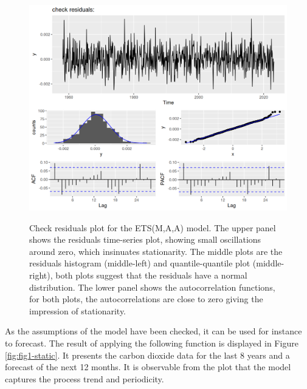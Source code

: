 \begin{figure}

{\centering \includegraphics[width=1\linewidth,alt={Check residuals plot for the ETS(M,A,A) model. The upper panel shows the residuals time-series plot, showing small oscillations around zero, which insinuates stationarity. The middle plots are the residuals histogram (middle-left) and quantile-quantile plot (middle-right), both plots suggest that the residuals have a normal distribution. The lower panel shows the autocorrelation functions, for both plots, the autocorrelations are close to zero giving the impression of stationarity.}]{figures/fig2-static-1} 

}

\caption{Check residuals plot for the ETS(M,A,A) model. The upper panel shows the residuals time-series plot, showing small oscillations around zero, which insinuates stationarity. The middle plots are the residuals histogram (middle-left) and quantile-quantile plot (middle-right), both plots suggest that the residuals have a normal distribution. The lower panel shows the autocorrelation functions, for both plots, the autocorrelations are close to zero giving the impression of stationarity.}\label{fig:fig2-static}
\end{figure}



As the assumptions of the model have been checked, it can be used for instance to forecast. The result of applying the following function is displayed in Figure \ref{fig:fig1-static}. It presents the carbon dioxide data for the last 8 years and a forecast of the next 12 months. It is observable from the plot that the model captures the process trend and periodicity.

